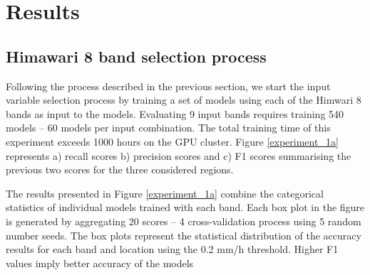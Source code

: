 \documentclass[3p,times]{elsarticle}
\begin{document}
\section{Results}

\subsection{Himawari 8 band selection process}

Following the process described in the previous section, we start the input variable selection process by training a set of models using each of the Himwari 8 bands as input to the models. Evaluating 9 input bands requires training 540 models -- 60 models per input combination. The total training time of this experiment exceeds 1000 hours on the GPU cluster. Figure \ref{experiment_1a} represents a) recall scores b) precision scores and c) F1 scores summarising the previous two scores for the three considered regions.

The results presented in Figure \ref{experiment_1a} combine the categorical statistics of individual models trained with each band. Each box plot in the figure is generated by aggregating 20 scores -- 4 cross-validation process using 5 random number seeds. The box plots represent the statistical distribution of the accuracy results for each band and location using the 0.2 mm/h threshold. Higher F1 values imply better accuracy of the models
\end{document}
